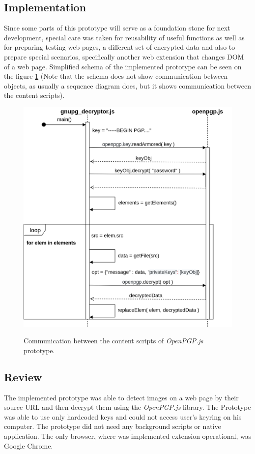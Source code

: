 \subsection{Implementation}
Since some parts of this prototype will serve as a foundation stone for next development, special care was taken for reusability of useful functions as well as for preparing testing web pages, a different set of encrypted data and also to prepare special scenarios, specifically another web extension that changes DOM of a web page. Simplified schema of the implemented prototype can be seen on the figure \ref{img:openpgp-sequence} (Note that the schema does not show communication between objects, as usually a sequence diagram does, but it shows communication between the content scripts).
\begin{figure}[H]
    \begin{center}
        \label{img:openpgp-sequence}
        \includegraphics[width=1.3\textwidth,angle=90]{obrazky-figures/openpgp-sequence.png}
        \caption{Communication between the content scripts of \textit{OpenPGP.js} prototype.}
    \end{center}
\end{figure}


\subsection{Review}
The implemented prototype was able to detect images on a web page by their source URL and then decrypt them using the \textit{OpenPGP.js} library. The Prototype was able to use only hardcoded keys and could not access user's keyring on his computer. The prototype did not need any background scripts or native application. The only browser, where was implemented extension operational, was Google Chrome.

